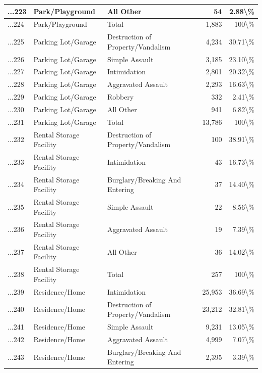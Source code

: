 \documentclass[
]{krantz}
\begin{document}
\begin{longtable}[t]{l|l|l|r|r}
\hline
...223 & Park/Playground & All Other & 54 & 2.88\textbackslash{}\%\\
\hline
...224 & Park/Playground & Total & 1,883 & 100\textbackslash{}\%\\
\hline
...225 & Parking Lot/Garage & Destruction of Property/Vandalism & 4,234 & 30.71\textbackslash{}\%\\
\hline
...226 & Parking Lot/Garage & Simple Assault & 3,185 & 23.10\textbackslash{}\%\\
\hline
...227 & Parking Lot/Garage & Intimidation & 2,801 & 20.32\textbackslash{}\%\\
\hline
...228 & Parking Lot/Garage & Aggravated Assault & 2,293 & 16.63\textbackslash{}\%\\
\hline
...229 & Parking Lot/Garage & Robbery & 332 & 2.41\textbackslash{}\%\\
\hline
...230 & Parking Lot/Garage & All Other & 941 & 6.82\textbackslash{}\%\\
\hline
...231 & Parking Lot/Garage & Total & 13,786 & 100\textbackslash{}\%\\
\hline
...232 & Rental Storage Facility & Destruction of Property/Vandalism & 100 & 38.91\textbackslash{}\%\\
\hline
...233 & Rental Storage Facility & Intimidation & 43 & 16.73\textbackslash{}\%\\
\hline
...234 & Rental Storage Facility & Burglary/Breaking And Entering & 37 & 14.40\textbackslash{}\%\\
\hline
...235 & Rental Storage Facility & Simple Assault & 22 & 8.56\textbackslash{}\%\\
\hline
...236 & Rental Storage Facility & Aggravated Assault & 19 & 7.39\textbackslash{}\%\\
\hline
...237 & Rental Storage Facility & All Other & 36 & 14.02\textbackslash{}\%\\
\hline
...238 & Rental Storage Facility & Total & 257 & 100\textbackslash{}\%\\
\hline
...239 & Residence/Home & Intimidation & 25,953 & 36.69\textbackslash{}\%\\
\hline
...240 & Residence/Home & Destruction of Property/Vandalism & 23,212 & 32.81\textbackslash{}\%\\
\hline
...241 & Residence/Home & Simple Assault & 9,231 & 13.05\textbackslash{}\%\\
\hline
...242 & Residence/Home & Aggravated Assault & 4,999 & 7.07\textbackslash{}\%\\
\hline
...243 & Residence/Home & Burglary/Breaking And Entering & 2,395 & 3.39\textbackslash{}\%\\

\end{longtable}
\end{document}
